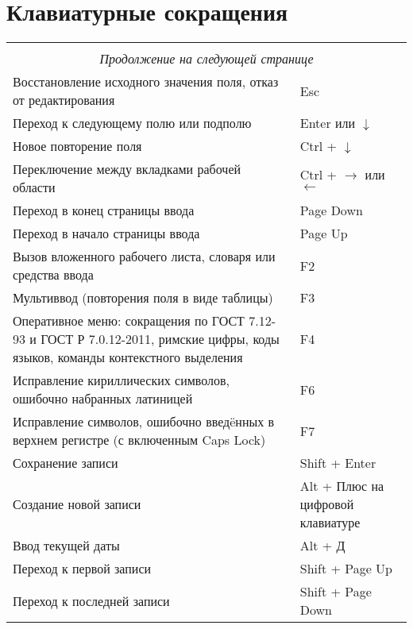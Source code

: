 \chapter{Клавиатурные сокращения}

\noindent\begin{longtable}{| p{7.5cm} | p{3cm} |}
	\hline
	\thead{Действие} & \thead{Клавиши} \\
	\hline\endfirsthead
	\thead{Действие} & \thead{Клавиши} \\
    \hline\endhead
    \hline
    \multicolumn{2}{c}{\emph{Продолжение на следующей странице}}   \\
    \endfoot
    \hline\endlastfoot
     Восстановление исходного значения поля, отказ от редактирования & Esc \\
	\hline
	Переход к следующему полю или подполю & Enter или $\downarrow$ \\
	\hline
	Новое повторение поля & Ctrl + $\downarrow$ \\
	\hline
	Переключение между вкладками рабочей области & Ctrl + $\rightarrow$ или $\leftarrow$ \\
	\hline
	Переход в конец страницы ввода & Page Down \\
	\hline
	Переход в начало страницы ввода & Page Up \\
	\hline
	Вызов вложенного рабочего листа, словаря или средства ввода & F2 \\
	\hline
	Мультиввод (повторения поля в виде таблицы) & F3 \\
	\hline
	Оперативное меню: сокращения по ГОСТ 7.12-93 и ГОСТ Р 7.0.12-2011, римские цифры, коды языков, команды контекстного выделения & F4 \\
	\hline
	Исправление кириллических символов, ошибочно набранных латиницей & F6 \\
	\hline
	Исправление символов, ошибочно введ\"eнных в верхнем регистре (с включенным Caps Lock) & F7 \\
	\hline
	Сохранение записи & Shift + Enter \\
	\hline
	Создание новой записи & Alt + Плюс на цифровой клавиатуре \\
	\hline
	Ввод текущей даты & Alt + Д \\
	\hline	
	Переход к первой записи & Shift + Page Up \\
	\hline
	Переход к последней записи & Shift + Page Down \\

\end{longtable}
